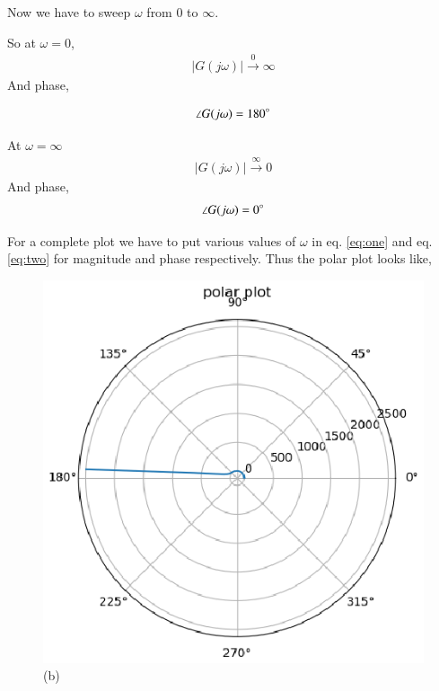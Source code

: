 \begin{enumerate}[label=\thesection.\arabic*.,ref=\thesection.\theenumi]
Now we have to sweep $\omega$ from 0 to $\infty$.

So at $\omega = 0$,
\begin{align}
    |G(j \omega)| \xrightarrow{0} \infty 
\end{align}
And phase,

\begin{align}
    \angle {G(j \omega)} = 180 \degree
\end{align}

At $\omega = \infty$
\begin{align}
    |G(j \omega)| \xrightarrow{\infty} 0
\end{align}
 And phase,
\begin{align}
    \angle {G(j \omega)} = 0 \degree
\end{align}

For a complete plot we have to put various values of $\omega$ in 
eq. \ref{eq:one} and eq. \ref{eq:two} for magnitude and phase respectively.
Thus the polar plot looks like, 

\begin{figure}[!h]
  \includegraphics[width=\columnwidth]{./figs/ee18btech11028/polarplot.eps}
  \caption{(b)}
  \label{fig:polarplot}
\end{figure}


\end{enumerate}
